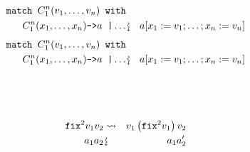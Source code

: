 \documentclass{beamer}
\newcommand{\assign}{:=}
\newcommand{\downsquigarrow}{{\mbox{\rotatebox[origin=c]{-90}{$\rightsquigarrow$}}}}
\newcommand{\tmverbatim}[1]{\text{{\ttfamily{#1}}}}
\begin{document}
{\hlstd{ \ }}{\hlopt{(}}{}{}{\hlopt{(}}{}{\hlopt{, (}}{}{\hlopt{(}}{}{\hlopt{, }}{}{\hlopt{)))
}}{}{\hlendline{}}\\
{\hlstd{ \ }}{\hlopt{ \ \textbar }}{}{\hlopt{(}}{}{\hlopt{, }}{}{\hlopt{) -> }}{}{\hlopt{+ }}{\hlopt{(}}{}{\hlopt{(}}{}{}{\hlopt{->}}{\hlendline{}}\\
{\hlstd{ \ \ \ \ \ }}{}{}{}{\hlendline{}}\\
{\hlstd{ \ \ \ \ \ \ \ }}{\hlopt{\textbar }}{}{\hlopt{->
}}{}{\hlendline{}}\\
{\hlstd{ \ \ \ }}{\hlopt{ \ \ \ \textbar }}{}{\hlopt{(}}{}{\hlopt{, }}{}{\hlopt{) -> }}{}{\hlopt{+ }}{}{\hlopt{))}}{}{\hlopt{) }}
\begin{eqnarray*}
  \text{\tmverbatim{match }} C_1^n (v_1, \ldots, v_n) \text{\tmverbatim{
  with}} &  & \\
  C_1^n (x_1, \ldots, x_n) \text{\tmverbatim{->}} a \text{\tmverbatim{
  \textbar }} \ldots & \downsquigarrow & a [x_1 \assign v_1 ; \ldots ; x_n
  \assign v_n]
\end{eqnarray*}
{\newpage}
\begin{eqnarray*}
  \text{\tmverbatim{match }} C_1^n (v_1, \ldots, v_n) \text{\tmverbatim{
  with}} &  & \\
  C_1^n (x_1, \ldots, x_n) \text{\tmverbatim{->}} a \text{\tmverbatim{
  \textbar }} \ldots & \downsquigarrow & a [x_1 \assign v_1 ; \ldots ; x_n
  \assign v_n]
\end{eqnarray*}
{\hlstd{ \ }}{}{\hlopt{+ }}{\hlopt{(}}{}{\hlopt{(}}{}{}{\hlopt{->}}{\hlendline{}}\\
{\hlstd{ \ \ \ \ \ }}{}{}{}{\hlendline{}}\\
{\hlstd{ \ \ \ \ \ \ \ }}{\hlopt{\textbar }}{}{\hlopt{->
}}{}{\hlendline{}}\\
{\hlstd{ \ \ \ }}{\hlopt{ \ \ \ \textbar }}{}{\hlopt{(}}{}{\hlopt{, }}{}{\hlopt{) -> }}{}{\hlopt{+ }}{}{\hlopt{))}}{\hlopt{ (}}{}{\hlopt{(}}{}{\hlopt{, }}{}{\hlopt{))}}
\begin{eqnarray*}
  \text{\tmverbatim{fix}}^2 v_1 v_2 & \rightsquigarrow & v_1  \left(
  \text{\tmverbatim{fix}}^2 v_1 \right) v_2\\
  a_1 a_2 & \downsquigarrow & a_1 a_2'
\end{eqnarray*}
\end{document}
